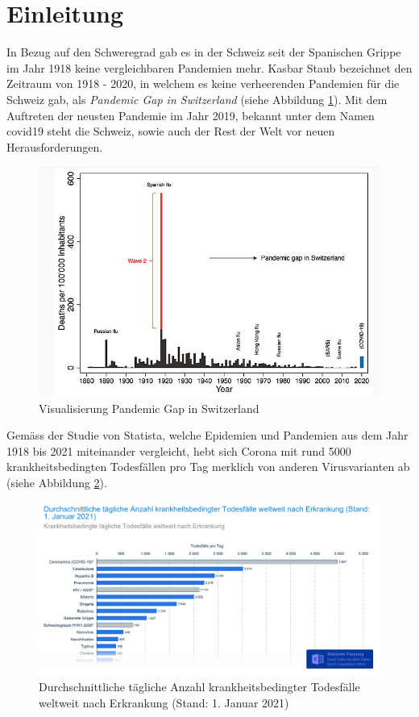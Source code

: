 \section{Einleitung}
In Bezug auf den Schweregrad gab es in der Schweiz seit der Spanischen Grippe im Jahr 1918 keine vergleichbaren Pandemien mehr. Kasbar Staub bezeichnet den Zeitraum von 1918 - 2020, in welchem es keine verheerenden Pandemien für die Schweiz gab, als \textit{Pandemic Gap in Switzerland} (siehe Abbildung \ref{fig:pandemic_gap_switzerland}). Mit dem Auftreten der neusten Pandemie im Jahr 2019, bekannt unter dem Namen \gls{covid19} steht die Schweiz, sowie auch der Rest der Welt vor neuen Herausforderungen.

\begin{figure}[ht]
    \includegraphics[width=12cm]{images/pandemic_gap_switzerland.png}
    \centering
    \caption{Visualisierung Pandemic Gap in Switzerland ~\citep{switzerland_pandemic_gap}}
    \label{fig:pandemic_gap_switzerland}
\end{figure}


Gemäss der Studie von Statista, welche Epidemien und Pandemien aus dem Jahr 1918 bis 2021 miteinander vergleicht, hebt sich Corona mit rund 5000 krankheitsbedingten Todesfällen pro Tag merklich von anderen Virusvarianten ab (siehe Abbildung \ref{fig:daily_deaths_due_to_contamination}).

\begin{figure}[ht]
    \includegraphics[width=12cm]{images/daily_deaths_after_contamination.png}
    \centering
    \caption{Durchschnittliche tägliche Anzahl krankheitsbedingter Todesfälle weltweit nach Erkrankung (Stand:
1. Januar 2021) ~\citep[S. 6]{worldwide_epidemic_cases_study}}
    \label{fig:daily_deaths_due_to_contamination}
\end{figure}

